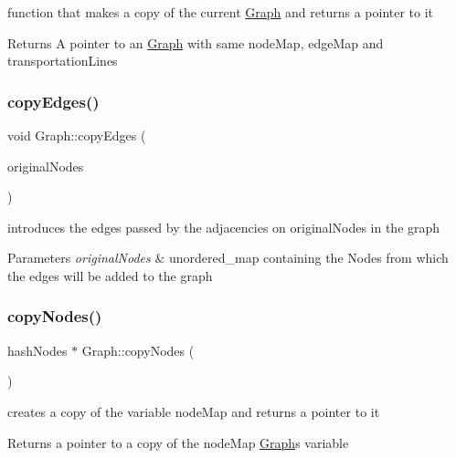 function that makes a copy of the current \hyperlink{class_graph}{Graph} and returns a pointer to it 

\begin{DoxyReturn}{Returns}
A pointer to an \hyperlink{class_graph}{Graph} with same node\+Map, edge\+Map and transportation\+Lines 
\end{DoxyReturn}
\mbox{\label{class_graph_a297bab836a9397ef5732b3924deeafb4}} 
\subsubsection{\texorpdfstring{copy\+Edges()}{copyEdges()}}
{\footnotesize\ttfamily void Graph\+::copy\+Edges (\begin{DoxyParamCaption}\item[{hash\+Nodes}]{original\+Nodes }\end{DoxyParamCaption})}



introduces the edges passed by the adjacencies on original\+Nodes in the graph 


\begin{DoxyParams}{Parameters}
{\em original\+Nodes} & unordered\+\_\+map containing the Nodes from which the edges will be added to the graph \\
\hline
\end{DoxyParams}
\mbox{\label{class_graph_a02b0af25356896f49a3941e8f1bac3b8}} 
\subsubsection{\texorpdfstring{copy\+Nodes()}{copyNodes()}}
{\footnotesize\ttfamily hash\+Nodes $\ast$ Graph\+::copy\+Nodes (\begin{DoxyParamCaption}{ }\end{DoxyParamCaption})}



creates a copy of the variable node\+Map and returns a pointer to it 

\begin{DoxyReturn}{Returns}
a pointer to a copy of the node\+Map \hyperlink{class_graph}{Graph}\textquotesingle{}s variable 
\end{DoxyReturn}
\mbox{\label{class_graph_a19c3559dc86f0dd1da72a157f864f449}} 
